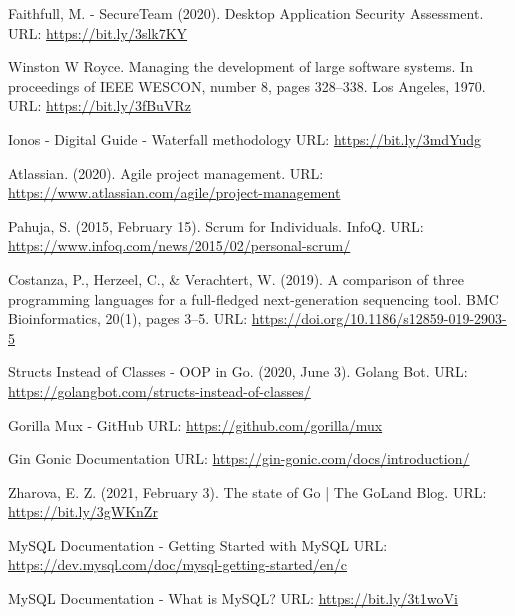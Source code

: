 \begin{thebibliography}{00}
    
 Faithfull, M. - SecureTeam (2020). Desktop Application Security Assessment.
\newline
URL: \url{https://bit.ly/3slk7KY}

 Winston W Royce. Managing the development of large software systems. In proceedings of IEEE WESCON, number 8,
pages 328–338. Los Angeles, 1970.
\newline
URL: \url{https://bit.ly/3fBuVRz}

 Ionos - Digital Guide - Waterfall methodology
\newline
URL: \url{https://bit.ly/3mdYudg}

 Atlassian. (2020). Agile project management.
\newline
URL: \url{https://www.atlassian.com/agile/project-management}

 Pahuja, S. (2015, February 15). Scrum for Individuals. InfoQ.
\newline
URL: \url{https://www.infoq.com/news/2015/02/personal-scrum/}

 Costanza, P., Herzeel, C., \& Verachtert, W. (2019). A comparison of three programming languages for a full-fledged next-generation sequencing tool. BMC Bioinformatics, 20(1), pages 3–5. 
\newline
URL: \url{https://doi.org/10.1186/s12859-019-2903-5}

 Structs Instead of Classes - OOP in Go. (2020, June 3). Golang Bot.
\newline
URL: \url{https://golangbot.com/structs-instead-of-classes/}

 Gorilla Mux - GitHub
\newline
URL: \url{https://github.com/gorilla/mux}

 Gin Gonic Documentation
\newline
URL: \url{https://gin-gonic.com/docs/introduction/}

 Zharova, E. Z. (2021, February 3). The state of Go | The GoLand Blog.
\newline
URL: \url{https://bit.ly/3gWKnZr}

 MySQL Documentation - Getting Started with MySQL
\newline
URL: \url{https://dev.mysql.com/doc/mysql-getting-started/en/c}

 MySQL Documentation - What is MySQL?
\newline
URL: \url{https://bit.ly/3t1woVi}


\end{thebibliography}
